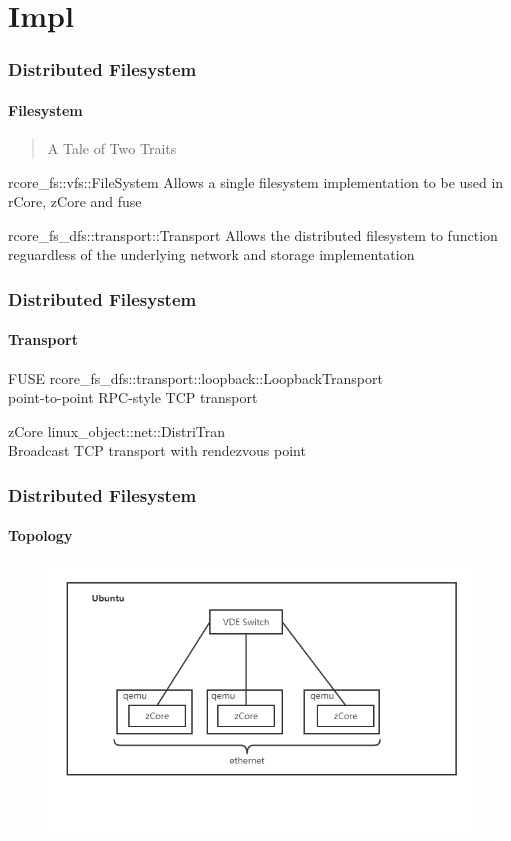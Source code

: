 \documentclass{ctexbeamer}
\begin{document}
\section{Impl}
\begin{frame}
\frametitle{Distributed Filesystem}
\framesubtitle{Filesystem}
\begin{verse}
  A Tale of Two Traits
\end{verse}
\begin{block}{rcore\_fs::vfs::FileSystem}
  Allows a single filesystem implementation to be used in rCore, zCore and fuse
\end{block}
\begin{block}{rcore\_fs\_dfs::transport::Transport}
  Allows the distributed filesystem to function reguardless of the underlying network and storage implementation
\end{block}
\end{frame}

\begin{frame}
\frametitle{Distributed Filesystem}
\framesubtitle{Transport}
\begin{block}{FUSE}
  rcore\_fs\_dfs::transport::loopback::LoopbackTransport \\
  point-to-point RPC-style TCP transport \\
\end{block}
\begin{block}{zCore}
  linux\_object::net::DistriTran \\
  Broadcast TCP transport with rendezvous point \\
\end{block}
\end{frame}

\begin{frame}
\frametitle{Distributed Filesystem}
\framesubtitle{Topology}
\begin{figure}
  \includegraphics[width=\textwidth]{./images/image2.png}
\end{figure}
\end{frame}
\end{document}

